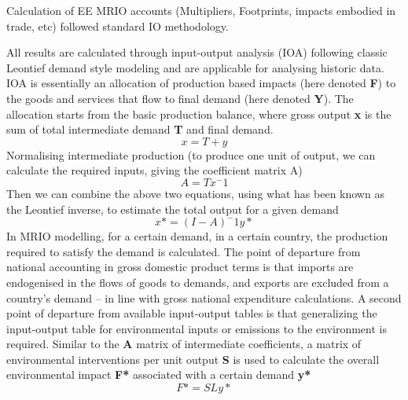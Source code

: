 Calculation of EE MRIO accounts (Multipliers, Footprints, impacts embodied in trade, etc) followed
standard IO methodology. 

All results are  calculated through input-output analysis (IOA) following classic Leontief demand style modeling and are applicable for analysing historic data. IOA is essentially an allocation of production based impacts (here denoted \textbf{F}) to the goods and services that flow to final demand (here denoted \textbf{Y}). The allocation starts from the basic production balance, where gross output \textbf{x} is the sum of total intermediate demand \textbf{T} and final demand. 
\begin{equation}
    x=T+y
\end{equation}
Normalising intermediate production (to produce one unit of output, we can calculate the required inputs, giving the coefficient matrix A)
\begin{equation}
    A=T{x^-1}
\end{equation}
Then we can combine the above two equations, using what has been known as the Leontief inverse, to estimate the total output for a given demand
\begin{equation}
x*={(I-A)^-1}y*
\end{equation}
In MRIO modelling, for a certain demand, in a certain country, the production required to satisfy the demand is calculated. The point of departure from national accounting in gross domestic product terms is that imports are endogenised in the flows of goods to demands, and exports are excluded from a country’s demand – in line with gross national expenditure calculations. A second point of departure from available input-output tables is that generalizing the input-output table for environmental inputs or emissions to the environment is required. Similar to the \textbf{A} matrix of intermediate coefficients, a matrix of environmental interventions per unit output \textbf{S} is used to calculate the overall environmental impact \textbf{F*} associated with a certain demand \textbf{y*} 
\begin{equation}
F*=SLy*
\end{equation}
